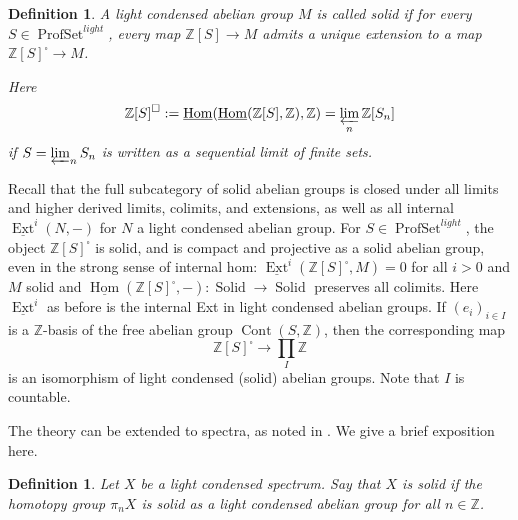 \documentclass[12pt]{article}
\newtheorem{definition}[theorem]{Definition}
\newcommand{\on}{\operatorname}
\begin{document}
\begin{definition}
A light condensed abelian group $M$ is called \emph{solid} if for every $S\in\on{ProfSet}^{light}$, every map $\mathbb{Z}[S]\to M$ admits a unique extension to a map $\mathbb{Z}[S]^\square\to M$.

Here
$$\mathbb{Z}[S]^\square := \underline{\on{Hom}}(\underline{\on{Hom}}(\mathbb{Z}[S],\mathbb{Z}),\mathbb{Z}) = \varprojlim_n \mathbb{Z}[S_n]$$
if $S=\varprojlim_n S_n$ is written as a sequential limit of finite sets.
\end{definition}Recall that the full subcategory of solid abelian groups is closed under all limits and higher derived limits, colimits, and extensions, as well as all internal $\underline{\on{Ext}}^i(N,-)$ for $N$ a light condensed abelian group.  For $S\in\on{ProfSet}^{light}$, the object $\mathbb{Z}[S]^\square$ is solid, and is compact and projective as a solid abelian group, even in the strong sense of internal hom: $\underline{\on{Ext}}^i(\mathbb{Z}[S]^\square, M)=0$ for all $i>0$ and $M$ solid and $\underline{\on{Hom}}(\mathbb{Z}[S]^\square,-):\on{Solid}\to\on{Solid}$ preserves all colimits.  Here $\underline{\on{Ext}}^i$ as before is the internal Ext in light condensed abelian groups.  If $(e_i)_{i\in I}$ is a $\mathbb{Z}$-basis of the free abelian group $\on{Cont}(S,\mathbb{Z})$, then the corresponding map
$$\mathbb{Z}[S]^\square \to \prod_I \mathbb{Z}$$
is an isomorphism of light condensed (solid) abelian groups.  Note that $I$ is countable.

The theory can be extended to spectra, as noted in \cite{ClausenAnalytic}.  We give a brief exposition here.

\begin{definition}
Let $X$ be a light condensed spectrum.  Say that $X$ is \emph{solid} if the homotopy group $\pi_n X$ is solid as a light condensed abelian group for all $n\in\mathbb{Z}$.
\end{definition}
\end{document}
